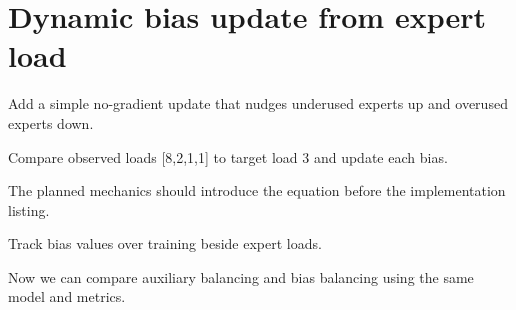 \section{Dynamic bias update from expert load}
\label{sec:ch09-dynamic-bias-update-from-expert-load}

Add a simple no-gradient update that nudges underused experts up and overused experts down.



Compare observed loads [8,2,1,1] to target load 3 and update each bias.



The planned mechanics should introduce the equation before the implementation listing.





\begin{checkpointbox}
Track bias values over training beside expert loads.
\end{checkpointbox}

Now we can compare auxiliary balancing and bias balancing using the same model and metrics.
